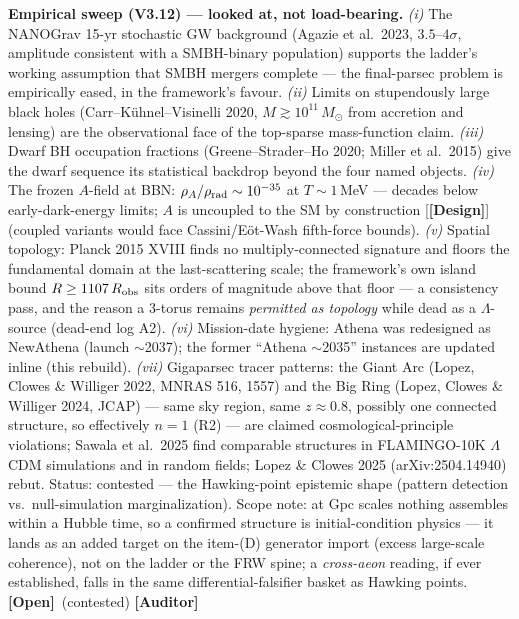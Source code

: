 \documentclass[11pt]{article}
\newcommand{\Open}{\textbf{\textcolor{gray!10!black}{[Open]}}}
\newcommand{\Auditor}{\textbf{\textcolor{teal!55!black}{[Auditor]}}}
\newcommand{\design}{\textcolor{blue!60!black}{\textbf{[Design]}}}
\newcommand{\msun}{M_\odot}
\begin{document}
\medskip\noindent\textbf{Empirical sweep (V3.12) --- looked at, not load-bearing.} \emph{(i)} The NANOGrav 15-yr stochastic GW background (Agazie et al.\ 2023, $3.5$--$4\sigma$, amplitude consistent with a SMBH-binary population) supports the ladder's working assumption that SMBH mergers complete --- the final-parsec problem is empirically eased, in the framework's favour. \emph{(ii)} Limits on stupendously large black holes (Carr--K\"uhnel--Visinelli 2020, $M\gtrsim10^{11}\,\msun$ from accretion and lensing) are the observational face of the top-sparse mass-function claim. \emph{(iii)} Dwarf BH occupation fractions (Greene--Strader--Ho 2020; Miller et al.\ 2015) give the dwarf sequence its statistical backdrop beyond the four named objects. \emph{(iv)} The frozen $A$-field at BBN: $\rho_A/\rho_{\rm rad}\sim10^{-35}$ at $T\sim1$\,MeV --- decades below early-dark-energy limits; $A$ is uncoupled to the SM by construction [\design] (coupled variants would face Cassini/E\"ot-Wash fifth-force bounds). \emph{(v)} Spatial topology: Planck 2015 XVIII finds no multiply-connected signature and floors the fundamental domain at the last-scattering scale; the framework's own island bound $R\ge1107\,R_{\rm obs}$ sits orders of magnitude above that floor --- a consistency pass, and the reason a 3-torus remains \emph{permitted as topology} while dead as a $\Lambda$-source (dead-end log A2). \emph{(vi)} Mission-date hygiene: Athena was redesigned as NewAthena (launch $\sim$2037); the former ``Athena $\sim$2035'' instances are updated inline (this rebuild). \emph{(vii)} Gigaparsec tracer patterns: the Giant Arc (Lopez, Clowes \& Williger 2022, MNRAS 516, 1557) and the Big Ring (Lopez, Clowes \& Williger 2024, JCAP) --- same sky region, same $z\approx0.8$, possibly one connected structure, so effectively $n=1$ (R2) --- are claimed cosmological-principle violations; Sawala et al.\ 2025 find comparable structures in FLAMINGO-10K $\Lambda$CDM simulations and in random fields; Lopez \& Clowes 2025 (arXiv:2504.14940) rebut. Status: contested --- the Hawking-point epistemic shape (pattern detection vs.\ null-simulation marginalization). Scope note: at Gpc scales nothing assembles within a Hubble time, so a confirmed structure is initial-condition physics --- it lands as an added target on the item-(D) generator import (excess large-scale coherence), not on the ladder or the FRW spine; a \emph{cross-aeon} reading, if ever established, falls in the same differential-falsifier basket as Hawking points. \Open\ (contested) \Auditor
\end{document}
